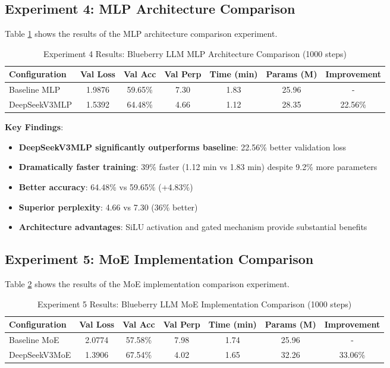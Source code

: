 \documentclass[11pt,a4paper]{article}
\begin{document}
\subsection{Experiment 4: MLP Architecture Comparison}

Table \ref{tab:exp4_results} shows the results of the MLP architecture comparison experiment.

\begin{table}[H]
\centering
\caption{Experiment 4 Results: Blueberry LLM MLP Architecture Comparison (1000 steps)}
\label{tab:exp4_results}
\begin{tabular}{@{}lcccccc@{}}
\toprule
Configuration & Val Loss & Val Acc & Val Perp & Time (min) & Params (M) & Improvement \\
\midrule
Baseline MLP & 1.9876 & 59.65\% & 7.30 & 1.83 & 25.96 & - \\
DeepSeekV3MLP & 1.5392 & 64.48\% & 4.66 & 1.12 & 28.35 & 22.56\% \\
\bottomrule
\end{tabular}
\end{table}

\textbf{Key Findings}:
\begin{itemize}
    \item \textbf{DeepSeekV3MLP significantly outperforms baseline}: 22.56\% better validation loss
    \item \textbf{Dramatically faster training}: 39\% faster (1.12 min vs 1.83 min) despite 9.2\% more parameters
    \item \textbf{Better accuracy}: 64.48\% vs 59.65\% (+4.83\%)
    \item \textbf{Superior perplexity}: 4.66 vs 7.30 (36\% better)
    \item \textbf{Architecture advantages}: SiLU activation and gated mechanism provide substantial benefits
\end{itemize}

\subsection{Experiment 5: MoE Implementation Comparison}

Table \ref{tab:exp5_results} shows the results of the MoE implementation comparison experiment.

\begin{table}[H]
\centering
\caption{Experiment 5 Results: Blueberry LLM MoE Implementation Comparison (1000 steps)}
\label{tab:exp5_results}
\begin{tabular}{@{}lcccccc@{}}
\toprule
Configuration & Val Loss & Val Acc & Val Perp & Time (min) & Params (M) & Improvement \\
\midrule
Baseline MoE & 2.0774 & 57.58\% & 7.98 & 1.74 & 25.96 & - \\
DeepSeekV3MoE & 1.3906 & 67.54\% & 4.02 & 1.65 & 32.26 & 33.06\% \\
\bottomrule
\end{tabular}
\end{table}
\end{document}
